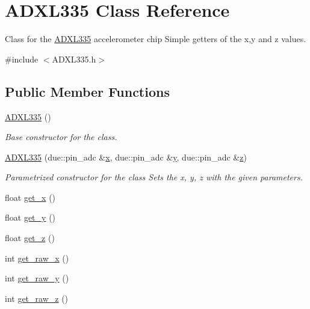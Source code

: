 \hypertarget{classADXL335}{}\section{A\+D\+X\+L335 Class Reference}
\label{classADXL335}


Class for the \hyperlink{classADXL335}{A\+D\+X\+L335} accelerometer chip Simple getters of the x,y and z values.  




{\ttfamily \#include $<$A\+D\+X\+L335.\+h$>$}

\subsection*{Public Member Functions}
\begin{DoxyCompactItemize}
\item 
\hyperlink{classADXL335_af6c1badeed65bb0bdc6410d96873081b}{A\+D\+X\+L335} ()
\begin{DoxyCompactList}\small\item\em Base constructor for the class. \end{DoxyCompactList}\item 
\hyperlink{classADXL335_a4aeb4ceac279de05b549e39940a558c9}{A\+D\+X\+L335} (due\+::pin\+\_\+adc \&\hyperlink{classADXL335_afa8e0faffb2114ec6b2d36b3cb9c337f}{x}, due\+::pin\+\_\+adc \&\hyperlink{classADXL335_a5a0eeced2cd28274b0a4e54cc097da74}{y}, due\+::pin\+\_\+adc \&\hyperlink{classADXL335_a26e9e2abcbd27d101b5d800c89847da8}{z})
\begin{DoxyCompactList}\small\item\em Parametrized constructor for the class Sets the x, y, z with the given parameters. \end{DoxyCompactList}\item 
float \hyperlink{classADXL335_a834d9d544d91c01c0343346cd47da2d2}{get\+\_\+x} ()
\item 
float \hyperlink{classADXL335_ad23857719cb5623109bf0b93d7ab7f46}{get\+\_\+y} ()
\item 
float \hyperlink{classADXL335_a7c8059b14949482bd3378ee1a07af593}{get\+\_\+z} ()
\item 
int \hyperlink{classADXL335_a84639e027507127c0a8433e193362ec8}{get\+\_\+raw\+\_\+x} ()
\item 
int \hyperlink{classADXL335_a886baf09e635c6a3d782926c0cbad5e3}{get\+\_\+raw\+\_\+y} ()
\item 
int \hyperlink{classADXL335_a7aed6e92324fca263d01e6275732ff6b}{get\+\_\+raw\+\_\+z} ()
\end{DoxyCompactItemize}
